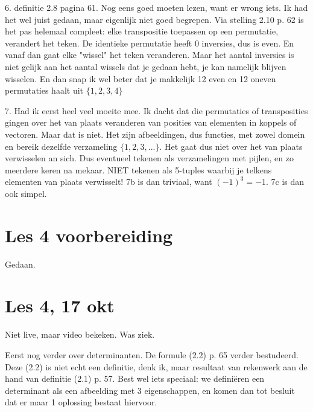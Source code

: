 \documentclass{article}
\begin{document}
6. definitie 2.8 pagina 61. Nog eens goed moeten lezen, want er wrong iets. Ik had het wel juist gedaan, maar eigenlijk niet goed begrepen. Via stelling 2.10 p. 62 is het pas helemaal compleet: elke transpositie toepassen op een permutatie, verandert het teken. De identieke permutatie heeft 0 inversies, dus is even. En vanaf dan gaat elke "wissel" het teken veranderen. Maar het aantal inversies is niet gelijk aan het aantal wissels dat je gedaan hebt, je kan namelijk blijven wisselen. En dan snap ik wel beter dat je makkelijk 12 even en 12 oneven permutaties haalt uit $\{1,2,3,4\}$

7. Had ik eerst heel veel moeite mee. Ik dacht dat die permutaties of transposities gingen over het van plaats veranderen van posities van elementen in koppels of vectoren. Maar dat is niet. Het zijn afbeeldingen, dus functies, met zowel domein en bereik dezelfde verzameling $\{1,2,3,...\}$. Het gaat dus niet over het van plaats verwisselen an sich. Dus eventueel tekenen als verzamelingen met pijlen, en zo meerdere keren na mekaar. NIET tekenen als 5-tuples waarbij je telkens elementen van plaats verwisselt! 
7b is dan triviaal, want $(-1)^3=-1$. 7c is dan ook simpel. 


\section{Les 4 voorbereiding} 
Gedaan. 

\section{Les 4, 17 okt}
Niet live, maar video bekeken. Was ziek. 

Eerst nog verder over determinanten. De formule (2.2) p. 65 verder bestudeerd. Deze (2.2) is niet echt een definitie, denk ik, maar resultaat van rekenwerk aan de hand van definitie (2.1) p. 57. Best wel iets speciaal: we defini\"eren een determinant als een afbeelding met 3 eigenschappen, en komen dan tot besluit dat er maar 1 oplossing bestaat hiervoor. 
\end{document}
